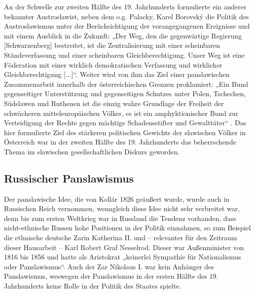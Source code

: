 \documentclass{../../sem_paper}
\begin{document}
An der Schwelle zur zweiten Hälfte des 19. Jahrhunderts formulierte ein anderer bekannter
Austroslawist, neben dem o.g. Palacky, Karel Borovský die Politik des Austroslawismus unter
der Berücksichtigung der vorangegangenen Ereignisse und mit einem Ausblick in die Zukunft:
„Der Weg, den die gegenwärtige Regierung [Schwarzenberg] bestreitet, ist die Zentralisierung
mit einer scheinbaren Ständeverfassung und einer scheinbaren Gleichberechtigung. Unser
Weg ist eine Föderation mit einer wirklich demokratischen Verfassung und wirklicher
Gleichberechtigung [...]“. Weiter wird von ihm das Ziel einer panslawischen Zusammenarbeit
innerhalb der österreichischen Grenzen proklamiert: „Ein Bund gegenseitiger Unterstützung
und gegenseitigen Schutzes unter Polen, Tschechen, Südslawen und Ruthenen ist die einzig
wahre Grundlage der Freiheit der schwächeren mitteleuropäischen Völker, es ist ein
amphyktionischer Bund zur Verteidigung der Rechte gegen mächtige Schadensstifter und
Gewalttäter“%
.
Das hier formulierte Ziel des stärkeren politischen Gewichts der slawischen Völker in
Österreich war in der zweiten Hälfte des 19. Jahrhunderts das beherrschende Thema im
slawischen gesellschaftlichen Diskurs geworden.

\subsection{Russischer Panslawismus}
Der panslawische Idee, die von Kollár 1826 geäußert wurde, wurde auch in Russischen Reich
vernommen, wenngleich diese Idee nicht sehr verbreitet war, denn bis zum ersten Weltkrieg
war in Russland die Tendenz vorhanden, dass nicht-ethnische Russen hohe Positionen in der
Politik einnahmen, so zum Beispiel die ethnische deutsche Zarin Katherina II. und –
relevanter für den Zeitraum dieser Hausarbeit – Karl Robert Graf Nesselrod. Dieser war
Außenminister von 1816 bis 1856 und hatte als Aristokrat „keinerlei Sympathie für
Nationalismus oder Panslawismus“\autocite[115]{kohn}. Auch der Zar Nikolaus I. war kein
Anhänger des Panslawismus, weswegen der Panslawismus in der ersten Hälfte des 19.
Jahrhunderts keine Rolle in der Politik des Staates spielte.
\end{document}
